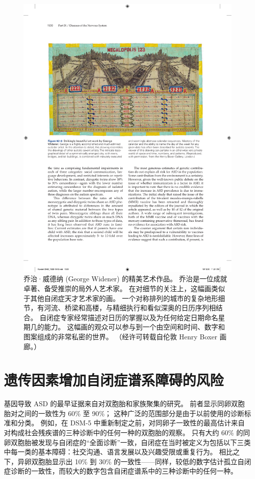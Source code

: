 \begin{figure}[htbp]
	\centering
	\includegraphics[width=0.9\linewidth]{chap62/fig_62_6}
	\caption{乔治·威德纳 (George Widener) 的精美艺术作品。 乔治是一位成就卓著、备受推崇的局外人艺术家。 在对细节的关注上，这幅画类似于其他自闭症天才艺术家的画。 一个对称排列的城市的复杂地形细节，有河流、桥梁和高楼，与精细执行和看似深奥的日历序列相结合。 自闭症专家经常描述对日历的掌握以及为任何给定日期命名星期几的能力。 这幅画的观众可以参与到一个由空间和时间、数字和图案组成的非常私密的世界。 （经许可转载自伦敦 Henry Boxer 画廊。）}
	\label{fig:62_6}
\end{figure}

\section{遗传因素增加自闭症谱系障碍的风险}

基因导致 ASD 的最早证据来自对双胞胎和家族聚集的研究。 前者显示同卵双胞胎对之间的一致性为 60\% 至 90\%； 这种广泛的范围部分是由于以前使用的诊断标准和分类。 例如，在 DSM-5 中重新制定之前，对同卵子一致性的最高估计来自对构成社会残疾谱的三种诊断中的任何一种的双胞胎的观察。 只有大约 60\% 的同卵双胞胎被发现与自闭症的“全面诊断”一致，自闭症在当时被定义为包括以下三类中每一类的基本障碍：社交沟通、语言发展以及兴趣受限或重复行为。 相比之下，异卵双胞胎显示出 10\% 到 30\% 的一致性——同样，较低的数字估计孤立自闭症诊断的一致性，而较大的数字包含自闭症谱系中的三种诊断中的任何一种。

